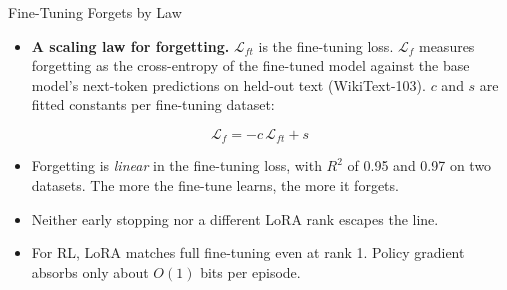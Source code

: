 \begin{frame}{Fine-Tuning Forgets by Law}
    \begin{itemize}\itemsep0.4em
        \item \textbf{A scaling law for forgetting.} $\mathcal{L}_{ft}$ is the fine-tuning loss. $\mathcal{L}_f$ measures forgetting as the cross-entropy of the fine-tuned model against the base model's next-token predictions on held-out text (WikiText-103). $c$ and $s$ are fitted constants per fine-tuning dataset:
    \end{itemize}
    \[
        \mathcal{L}_{f}=-c\,\mathcal{L}_{ft}+s
    \]
    \begin{itemize}\itemsep0.4em
        \item Forgetting is \emph{linear} in the fine-tuning loss, with $R^2$ of 0.95 and 0.97 on two datasets. The more the fine-tune learns, the more it forgets.
        \item Neither early stopping nor a different LoRA rank escapes the line.
        \item For RL, LoRA matches full fine-tuning even at rank 1. Policy gradient absorbs only about $O(1)$ bits per episode.
    \end{itemize}
    \vspace{0.3em}
\end{frame}

